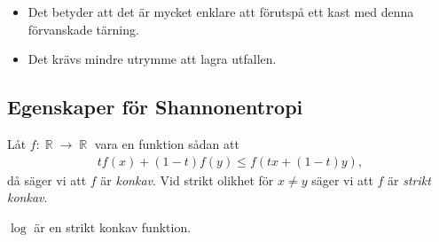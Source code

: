 \documentclass{beamer}
\DeclareMathOperator{\R}{\mathbb{R}}
\begin{document}
\begin{frame}
  \begin{itemize}
    \item Det betyder att det är mycket enklare att förutspå ett kast med denna 
      förvanskade tärning.
    \item Det krävs mindre utrymme att lagra utfallen.
  \end{itemize}
\end{frame}

\subsection{Egenskaper för Shannonentropi}

\begin{frame}
  \begin{definition}
    Låt \(f\colon \R\to \R\) vara en funktion sådan att
    \begin{align*}
      tf(x) + (1-t)f(y) \leq f(tx + (1-t)y),
    \end{align*}
    då säger vi att \(f\) är \emph{konkav}.
    Vid strikt olikhet för \(x\neq y\) säger vi att \(f\) är \emph{strikt 
    konkav}.
  \end{definition}

  \begin{example}
    \(\log\) är en strikt konkav funktion.
  \end{example}
\end{frame}

%
%
\end{document}
